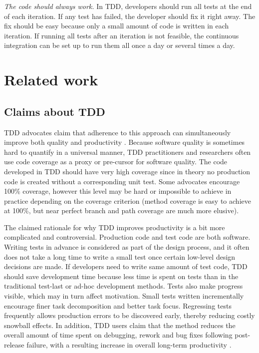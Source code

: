 \documentclass[smallextended]{svjour3}     %
\begin{document}
{\em The code should always work.} 
In TDD, developers should run 
all tests at the end of each iteration. If any test has failed, 
the developer should fix it right away. The fix should be easy because 
only a small amount of code is written in each iteration. If running 
all tests after an iteration is not feasible, the continuous 
integration can be set up to run them all once a day or several 
times a day. 


\section{Related work}
\label{sec:RelatedWork}

\subsection{Claims about TDD}
\label{sec:tdd-claims}

TDD advocates claim that adherence to this approach can simultaneously
improve both quality and productivity \citep{Beck:01,Janzen:05}.  Because
software quality is sometimes hard to quantify in a universal manner, 
TDD practitioners and researchers
often use code coverage as a proxy or pre-cursor for software quality. The 
code developed
in TDD should have very high coverage since in theory no production code is created without
a corresponding unit test. Some advocates encourage 100\% coverage, however this 
level may be hard 
or impossible to achieve in practice depending on the coverage criterion 
(method coverage is easy 
to achieve at 100\%, but near perfect branch and path coverage are much more elusive). 

The claimed rationale for why TDD improves productivity is a bit more
complicated and controversial. Production code and test code are both software. 
Writing tests 
in advance is considered as  
part of the design process, and it often does not take a long time to write a
small test once certain low-level design decisions are made. 
If developers need to write  same amount of test code, TDD
should save development time because less time is spent on tests than in
the traditional test-last or ad-hoc development methods. 
Tests also make progress 
visible, which may in turn affect motivation. Small tests written incrementally encourage finer task decomposition
and better task focus. Regressing 
tests frequently allows production errors to be discovered early, 
thereby reducing costly snowball 
effects. In addition, TDD
users claim that the method reduces the overall amount of time spent on
debugging, rework and bug fixes following post-release failure, with a 
resulting increase in overall long-term
productivity \citep{Williams:03}.
\end{document}
